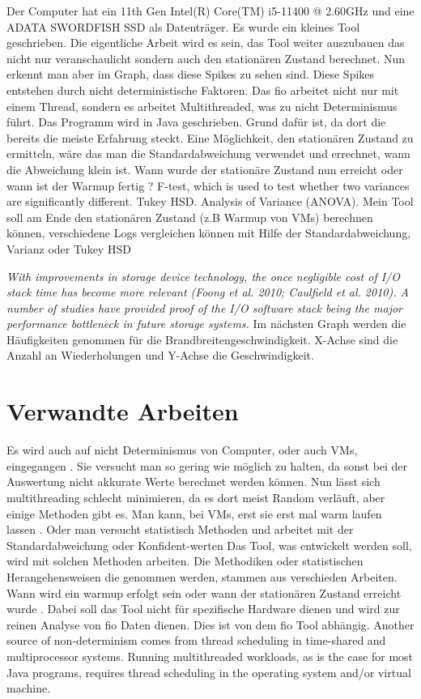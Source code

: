 \documentclass{article}
\begin{document}
Der Computer hat ein 11th Gen Intel(R) Core(TM) i5-11400 @ 2.60GHz und eine ADATA SWORDFISH SSD als Datenträger.
Es wurde ein kleines Tool geschrieben. Die eigentliche Arbeit wird es sein, das Tool weiter auszubauen das nicht nur veranschaulicht
sondern auch den stationären Zustand berechnet.
Nun erkennt man aber im Graph, dass diese Spikes zu sehen sind. Diese Spikes entstehen durch nicht deterministische Faktoren.
Das fio arbeitet nicht nur mit einem Thread, sondern es arbeitet Multithreaded, was zu nicht Determinismus führt. 
Das Programm wird in Java geschrieben. Grund dafür ist, da dort die bereits die meiste Erfahrung steckt.
Eine Möglichkeit, den stationären Zustand zu ermitteln, wäre das man die Standardabweichung verwendet und errechnet, wann die Abweichung klein ist.
Wann wurde der stationäre Zustand nun erreicht oder wann ist der Warmup fertig ? F-test,
which is used to test whether two variances are significantly different. Tukey HSD. Analysis of Variance (ANOVA). 
Mein Tool soll am Ende den stationären Zustand (z.B Warmup von VMs) berechnen können,
verschiedene Logs vergleichen können mit Hilfe der Standardabweichung, Varianz oder Tukey HSD

\textit{With improvements in storage device technology, the once negligible cost of I/O stack time has become more relevant (Foong et al. 2010; Caulfield et al. 2010). A number
of studies have provided proof of the I/O software stack being the major performance bottleneck in future storage systems.}
Im nächsten Graph werden die Häufigkeiten genommen für die Brandbreitengeschwindigkeit. X-Achse sind die Anzahl an Wiederholungen und Y-Achse die Geschwindigkeit.
\section{Verwandte Arbeiten}
Es wird auch auf nicht Determinismus von Computer, oder auch VMs, eingegangen \cite{vmsHotandCold}. Sie versucht man so gering wie möglich zu halten, da sonst bei der Auswertung nicht akkurate Werte
berechnet werden können. Nun lässt sich multithreading schlecht minimieren, da es dort meist Random verläuft, aber einige Methoden gibt es. Man kann, bei VMs,
erst sie erst mal warm laufen lassen \cite{vmsHotandCold}. Oder man versucht statistisch Methoden und arbeitet mit der Standardabweichung oder Konfident-werten
Das Tool, was entwickelt werden soll, wird mit solchen Methoden arbeiten. Die Methodiken oder statistischen Herangehensweisen die genommen werden,
stammen aus verschieden Arbeiten. Wann wird ein warmup erfolgt sein \cite{vmsHotandCold}
oder wann der stationären Zustand erreicht wurde \cite{vmsHotandCold}. Dabei soll das Tool nicht für spezifische Hardware dienen und wird zur reinen Analyse von fio Daten dienen. 
Dies ist von dem fio Tool abhängig.
Another source of non-determinism comes from thread scheduling in time-shared and multiprocessor systems. Running multithreaded
workloads, as is the case for most Java programs, requires thread scheduling in the operating system and/or virtual machine.  
\newpage
\end{document}
